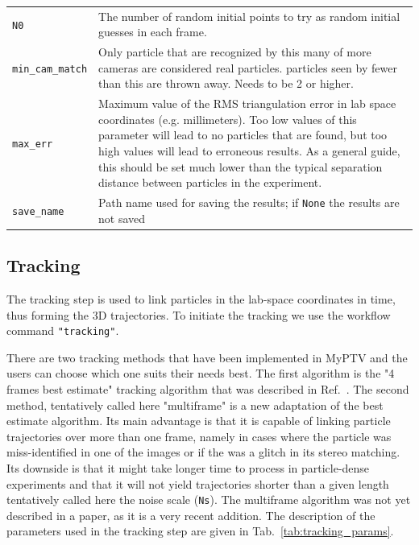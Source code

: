 \documentclass[10pt,a4paper]{article}
\begin{document}
\begin{table}[!ht]
\begin{tabular}{l m{13cm}}
		\texttt{N0} &  The number of random initial points to try as random initial guesses in each frame.\\[.1cm]
		
		\texttt{min\_cam\_match} & Only particle that are recognized by this many of more cameras are considered real particles. particles seen by fewer than this are thrown away. Needs to be 2 or higher. \\[.1cm]
		
		\texttt{max\_err} & Maximum value of the RMS triangulation error in lab space coordinates (e.g. millimeters). Too low values of this parameter will lead to no particles that are found, but too high values will lead to erroneous results. As a general guide, this should be set much lower than the typical separation distance between particles in the experiment.  \\[.1cm]
		
		\texttt{save\_name} & Path name used for saving the results; if \texttt{None} the results are not saved \\[.1cm]
		
		\hline
	\end{tabular}
\end{table}







\subsection{Tracking}\label{sec:workflow_track}

The tracking step is used to link particles in the lab-space coordinates in time, thus forming the 3D trajectories. To initiate the tracking we use the workflow command \texttt{"tracking"}. 

There are two tracking methods that have been implemented in MyPTV and the users can choose which one suits their needs best. The first algorithm is the "4 frames best estimate" tracking algorithm that was described in Ref.~\cite{Ouellette2006}. The second method, tentatively called here "multiframe" is a new adaptation of the best estimate algorithm. Its main advantage is that it is capable of linking particle trajectories over more than one frame, namely in cases where the particle was miss-identified in one of the images or if the was a glitch in its stereo matching. Its downside is that it might take longer time to process in particle-dense experiments and that it will not yield trajectories shorter than a given length tentatively called here the noise scale (\texttt{Ns}). The multiframe algorithm was not yet described in a paper, as it is a very recent addition. The description of the parameters used in the tracking step are given in Tab.~\ref{tab:tracking_params}. 
\end{document}
